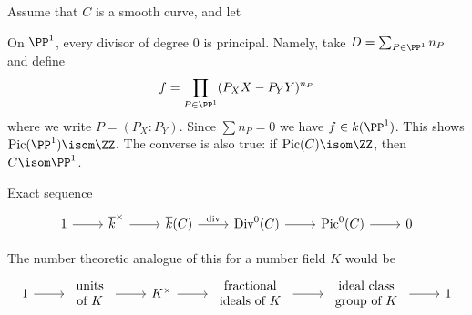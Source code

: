 \begin{definition}
    Assume that $C$ is a smooth curve, and let 
\end{definition}
 



\begin{example}
    On $\PP^1$, every divisor of degree $0$ is principal. Namely, take $D = \sum_{P \in \PP^1} n_P$ and define
    \[ f = \prod_{P \in \PP^1} (P_X X - P_Y Y)^{n_P} \]
    where we write $P = (P_X : P_Y)$. Since $\sum n_P = 0$ we have $f \in k(\PP^1)$. This shows $\text{Pic}(\PP^1) \isom \ZZ$. The converse is also true: if $\text{Pic}(C) \isom \ZZ$, then $C \isom \PP^1$.
\end{example}


Exact sequence
\[ \begin{tikzcd} 1 \arrow{r} & \overline{k}^\times \arrow{r} & \overline{k}(C) \arrow{r}{\text{div}} & \text{Div}^0(C) \arrow{r} & \text{Pic}^0(C) \arrow{r} & 0 \end{tikzcd} \]

The number theoretic analogue of this for a number field $K$ would be
\[ \begin{tikzcd} 1 \arrow{r} & \begin{array}{c} \text{units} \\ \text{of $K$} \end{array} \arrow{r} & K^\times \arrow{r} & \begin{array}{c} \text{fractional} \\ \text{ideals of $K$} \end{array} \arrow{r} & \begin{array}{c} \text{ideal class} \\ \text{group of $K$} \end{array} \arrow{r} & 1 \end{tikzcd} \]


